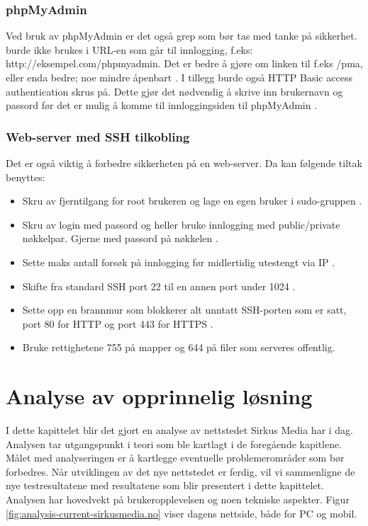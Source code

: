 \subsubsection{phpMyAdmin}
\label{sec:analysis-security-phpmyadmin}
Ved bruk av phpMyAdmin er det også grep som bør tas med tanke på sikkerhet.  burde ikke brukes i URL-en som går til innlogging, f.eks: http://eksempel.com/phpmyadmin. Det er bedre å gjøre om linken til f.eks /pma, eller enda bedre; noe mindre åpenbart \cite{canepa2016}.
I tillegg burde også HTTP Basic access authentication skrus på. Dette gjør det nødvendig å skrive inn brukernavn og passord før det er mulig å komme til innloggingsiden til phpMyAdmin \cite{drake_2018}.

\subsubsection{Web-server med SSH tilkobling}
\label{sec:analysis-security-web-server-ssh}
Det er også viktig å forbedre sikkerheten på en web-server. Da kan følgende tiltak benyttes:
\begin{itemize}
\item Skru av fjerntilgang for root brukeren og lage en egen bruker i sudo-gruppen \cite{ellingwood_2014}.
\item Skru av login med passord \cite{jetha2018} og heller bruke innlogging med public/private nøkkelpar. Gjerne med passord på nøkkelen \cite{jetha2018}.
\item Sette maks antall forsøk på innlogging før midlertidig utestengt via IP \cite{ellingwood_2014_2}.
\item Skifte fra standard SSH port 22 \cite{miessler2019} til en annen port under 1024 \cite{w3cports1995}.
\item Sette opp en brannmur som blokkerer alt unntatt SSH-porten som er satt, port 80 for HTTP og port 443 for HTTPS \cite{virdo2016}.
\item Bruke rettighetene 755 på mapper og 644 på filer som serveres offentlig. \cite[s.~34]{barnettapache}
\end{itemize}

\section{Analyse av opprinnelig løsning}

I dette kapittelet blir det gjort en analyse av nettstedet Sirkus Media har i dag. Analysen tar utgangspunkt i teori som ble kartlagt i de foregående kapitlene. Målet med analyseringen er å kartlegge eventuelle problemerområder som bør forbedres. Når utviklingen av det nye nettstedet er ferdig, vil vi sammenligne de nye testresultatene med resultatene som blir presentert i dette kapittelet. Analysen har hovedvekt på brukeropplevelsen og noen tekniske aspekter.
Figur \ref{fig:analysis-current-sirkusmedia.no} viser dagens nettside, både for PC og mobil.

